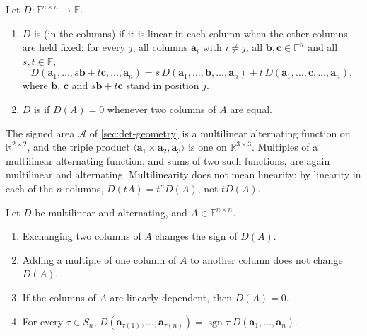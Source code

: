 \begin{definition}
\label{def:multilinear-alternating}
Let $D\colon\mathbb F^{n\times n}\to\mathbb F$.
\begin{enumerate}
\item $D$ is  (in the columns) if it is linear in each column when the other columns are held fixed: for every $j$, all columns $\mathbf a_i$ with $i\ne j$, all $\mathbf b,\mathbf c\in\mathbb F^n$ and all $s,t\in\mathbb F$,
\[
D(\mathbf a_1,\ldots,s\mathbf b+t\mathbf c,\ldots,\mathbf a_n)=s\,D(\mathbf a_1,\ldots,\mathbf b,\ldots,\mathbf a_n)+t\,D(\mathbf a_1,\ldots,\mathbf c,\ldots,\mathbf a_n),
\]
where $\mathbf b$, $\mathbf c$ and $s\mathbf b+t\mathbf c$ stand in position $j$.
\item $D$ is  if $D(A)=0$ whenever two columns of $A$ are equal.
\end{enumerate}
\end{definition}

The signed area $\mathcal A$ of \cref{sec:det-geometry} is a multilinear alternating function on $\mathbb R^{2\times2}$, and the triple product $\langle\mathbf a_1\times\mathbf a_2,\mathbf a_3\rangle$ is one on $\mathbb R^{3\times3}$. Multiples of a multilinear alternating function, and sums of two such functions, are again multilinear and alternating. Multilinearity does not mean linearity: by linearity in each of the $n$ columns, $D(tA)=t^nD(A)$, not $tD(A)$.

\begin{lemma}
\label{lem:alternating}
Let $D$ be multilinear and alternating, and $A\in\mathbb F^{n\times n}$.
\begin{enumerate}
\item Exchanging two columns of $A$ changes the sign of $D(A)$.
\item Adding a multiple of one column of $A$ to another column does not change $D(A)$.
\item If the columns of $A$ are linearly dependent, then $D(A)=0$.
\item For every $\tau\in S_n$, $D(\mathbf a_{\tau(1)},\ldots,\mathbf a_{\tau(n)})=\operatorname{sgn}\tau\;D(\mathbf a_1,\ldots,\mathbf a_n)$.
\end{enumerate}
\end{lemma}

